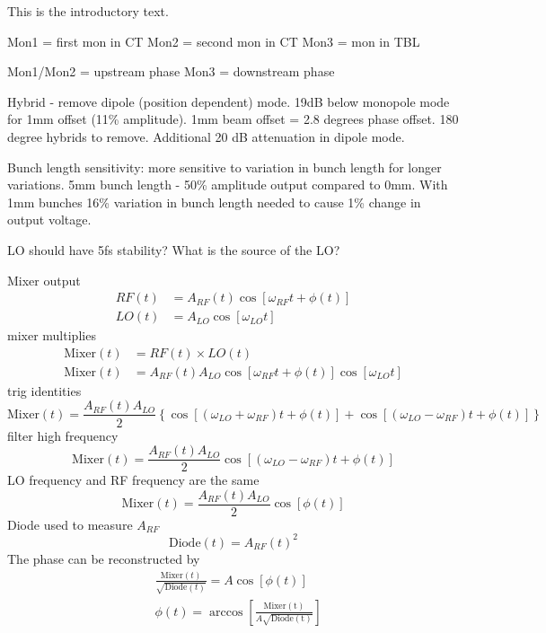 
This is the introductory text.

Mon1 = first mon in CT
Mon2 = second mon in CT
Mon3 = mon in TBL

Mon1/Mon2 = upstream phase
Mon3 = downstream phase


Hybrid - remove dipole (position dependent) mode. 19dB below monopole mode for 1mm offset (11\% amplitude). 1mm beam offset = 2.8 degrees phase offset. 180 degree hybrids to remove. Additional 20 dB attenuation in dipole mode.

Bunch length sensitivity: more sensitive to variation in bunch length for longer variations. 5mm bunch length - 50\% amplitude output compared to 0mm. With 1mm bunches 16\% variation in bunch length needed to cause 1\% change in output voltage.

LO should have 5fs stability? What is the source of the LO?

Mixer output
\begin{align}
RF(t) &= A_{RF}(t)\cos[\omega_{RF} t + \phi(t)] \\
LO(t) &= A_{LO}\cos[\omega_{LO} t]
\end{align}
mixer multiplies
\begin{align}
\mathrm{Mixer}(t) &= RF(t) \times LO(t) \\
\mathrm{Mixer}(t) &= A_{RF}(t)A_{LO}\cos[\omega_{RF} t + \phi(t)]\cos[\omega_{LO} t]
\end{align}
trig identities
\begin{equation}
\mathrm{Mixer}(t) = \frac{A_{RF}(t)A_{LO}}{2}\left\lbrace\cos[(\omega_{LO} + \omega_{RF})t + \phi(t)] + \cos[(\omega_{LO} - \omega_{RF})t + \phi(t)]\right\rbrace
\end{equation}
filter high frequency
\begin{equation}
\mathrm{Mixer}(t) = \frac{A_{RF}(t)A_{LO}}{2}\cos[(\omega_{LO} - \omega_{RF})t + \phi(t)]
\label{e:mixOutAnyFreq} 
\end{equation}
LO frequency and RF frequency are the same
\begin{equation}
\mathrm{Mixer}(t) = \frac{A_{RF}(t)A_{LO}}{2}\cos[\phi(t)]
\label{e:mixOutSameFreq} 
\end{equation}
Diode used to measure \(A_{RF}\)
\begin{equation}
\mathrm{Diode}(t) = A_{RF}(t)^2
\label{e:idealDiode}
\end{equation}
The phase can be reconstructed by
\begin{align}
&\frac{\mathrm{Mixer}(t)}{\sqrt{\mathrm{Diode}(t)}} = A\cos[\phi(t)] \label{e:mixOverSqrtDio} \\
&\phi(t) = \arccos\left[\frac{\mathrm{Mixer(t)}}{A\sqrt{\mathrm{Diode(t)}}}\right]
\label{e:phaseRecIdeal} 
\end{align}

